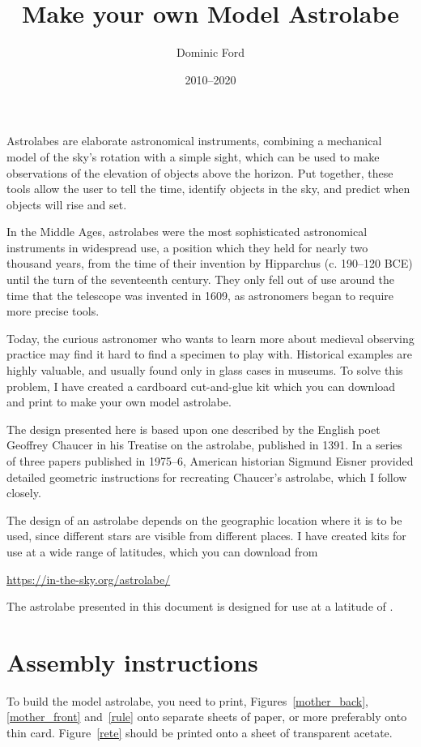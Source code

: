 \documentclass[a4paper,onecolumn,10pt]{article}
\title{Make your own Model Astrolabe}
\author{Dominic Ford}
\date{2010--2020}
\begin{document}
\maketitle
\setcounter{footnote}{1}

Astrolabes are elaborate astronomical instruments, combining a mechanical model
of the sky's rotation with a simple sight, which can be used to make
observations of the elevation of objects above the horizon. Put together, these
tools allow the user to tell the time, identify objects in the sky, and predict
when objects will rise and set.

In the Middle Ages, astrolabes were the most sophisticated astronomical
instruments in widespread use, a position which they held for nearly two
thousand years, from the time of their invention by Hipparchus (c. 190--120
BCE) until the turn of the seventeenth century. They only fell out of use
around the time that the telescope was invented in 1609, as astronomers began
to require more precise tools.

Today, the curious astronomer who wants to learn more about medieval observing
practice may find it hard to find a specimen to play with. Historical examples
are highly valuable, and usually found only in glass cases in museums. To solve
this problem, I have created a cardboard cut-and-glue kit which you can
download and print to make your own model astrolabe.

The design presented here is based upon one described by the English poet
Geoffrey Chaucer in his Treatise on the astrolabe, published in 1391. In a
series of three papers published in 1975--6, American historian Sigmund Eisner
provided detailed geometric instructions for recreating Chaucer's astrolabe,
which I follow closely.

The design of an astrolabe depends on the geographic location where it is to be
used, since different stars are visible from different places. I have created
kits for use at a wide range of latitudes, which you can download from

\url{https://in-the-sky.org/astrolabe/}

The astrolabe presented in this document is designed for use at a latitude of
.

\section*{Assembly instructions}

To build the model astrolabe, you need to print, Figures~\ref{mother_back},
\ref{mother_front} and~\ref{rule} onto separate sheets of paper, or more
preferably onto thin card. Figure~\ref{rete} should be printed onto a sheet of
transparent acetate.
\end{document}
